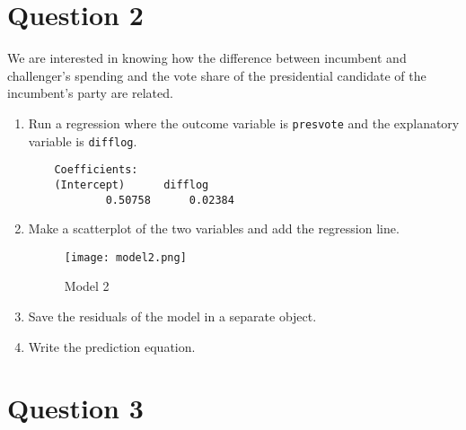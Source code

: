 \documentclass[12pt,letterpaper]{article}
\begin{document}
\section*{Question 2}
\noindent We are interested in knowing how the difference between incumbent and challenger's spending and the vote share of the presidential candidate of the incumbent's party are related.	\vspace{.25cm}
	\begin{enumerate}
	\item Run a regression where the outcome variable is \texttt{presvote} and the explanatory variable is \texttt{difflog}.	
	
	  
	\begin{verbatim}
    Coefficients:
	(Intercept)      difflog  
			0.50758      0.02384  
	\end{verbatim}
	\vspace{2cm}
	\item Make a scatterplot of the two variables and add the regression line. 	
	 
	\begin{figure}[h!]
		\caption{\footnotesize{Model 2}}
		\vspace{.5cm}
		\centering
		\label{fig:Model 2}			
		\texttt{[image: model2.png]}
	\end{figure}		
	\vspace{2cm}
	\item Save the residuals of the model in a separate object.	
	 
	\vspace{2cm}
	\item Write the prediction equation.
	 
\end{enumerate}
	
	\newpage	
\section*{Question 3}
\end{document}
